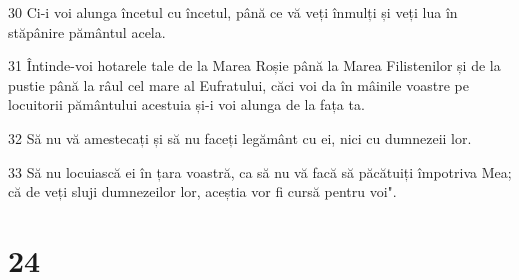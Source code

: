 \par 30 Ci-i voi alunga încetul cu încetul, până ce vă veți înmulți și veți lua în stăpânire pământul acela.
\par 31 Întinde-voi hotarele tale de la Marea Roșie până la Marea Filistenilor și de la pustie până la râul cel mare al Eufratului, căci voi da în mâinile voastre pe locuitorii pământului acestuia și-i voi alunga de la fața ta.
\par 32 Să nu vă amestecați și să nu faceți legământ cu ei, nici cu dumnezeii lor.
\par 33 Să nu locuiască ei în țara voastră, ca să nu vă facă să păcătuiți împotriva Mea; că de veți sluji dumnezeilor lor, aceștia vor fi cursă pentru voi".

\chapter{24}

